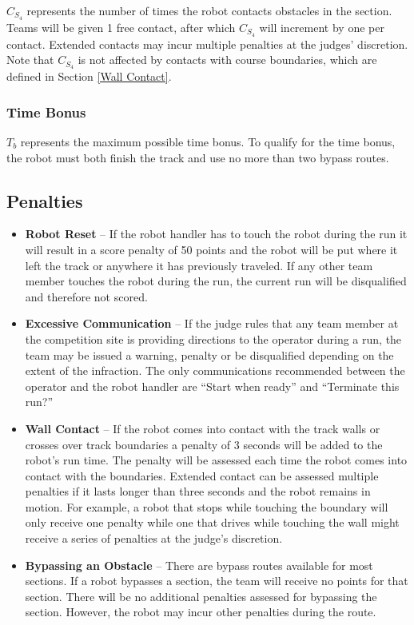 $C_{S_4}$ represents the number of times the robot contacts obstacles in the section. Teams will be given 1 free contact, after which $C_{S_4}$ will increment by one per contact. Extended contacts may incur multiple penalties at the judges' discretion. Note that $C_{S_4}$ is not affected by contacts with course boundaries, which are defined in Section \ref{Wall Contact}.


\subsubsection{Time Bonus}
$T_b$ represents the maximum possible time bonus. To qualify for the time bonus, the robot must both finish the track and use no more than two bypass routes.

\subsection{Penalties}
\begin{itemize}
\item \textbf{Robot Reset} – If the robot handler has to touch the robot during the run it will result in a score penalty of 50 points and the robot will be put where it left the track or anywhere it has previously traveled. If any other team member touches the robot during the run, the current run will be disqualified and therefore not scored.
\item \textbf{Excessive Communication} – If the judge rules that any team member at the competition site is providing directions to the operator during a run, the team may be issued a warning, penalty or be disqualified depending on the extent of the infraction. The only communications recommended between the operator and the robot handler are “Start when ready” and “Terminate this run?” 
\item  \textbf{Wall Contact}\label{Wall Contact} – If the robot comes into contact with the track walls or crosses over track boundaries a penalty of 3 seconds will be added to the robot's run time. The penalty will be assessed each time the robot comes into contact with the boundaries. Extended contact can be assessed multiple penalties if it lasts longer than three seconds and the robot remains in motion. For example, a robot that stops while touching the boundary will only receive one penalty while one that drives while touching the wall might receive a series of penalties at the judge’s discretion.
\item \textbf{Bypassing an Obstacle}\label{bypass} -- There are bypass routes available for most sections. If a robot bypasses a section, the team will receive no points for that section. There will be no additional penalties assessed for bypassing the section. However, the robot may incur other penalties during the route.  
\end{itemize}

